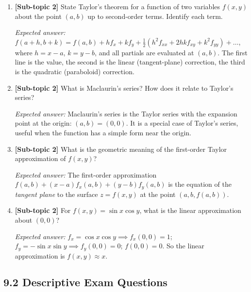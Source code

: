 \documentclass[12pt,a4paper]{article}
\begin{document}
\begin{enumerate}[leftmargin=*, label=\textbf{Q\arabic*.}]
  \textit{Expected answer:} \( J_1 \cdot J_2 = 1 \), provided the transformation is invertible. This is analogous to the chain rule for ordinary derivatives: \( (dy/dx)\cdot(dx/dy) = 1 \).

  \item \textbf{[Sub-topic 2]} State Taylor's theorem for a function of two variables \( f(x,y) \) about the point \( (a,b) \) up to second-order terms. Identify each term.

  \textit{Expected answer:} \( f(a+h,b+k) = f(a,b) + hf_x + kf_y + \tfrac{1}{2}(h^2f_{xx}+2hkf_{xy}+k^2f_{yy}) + \ldots \), where \( h=x-a \), \( k=y-b \), and all partials are evaluated at \( (a,b) \). The first line is the value, the second is the linear (tangent-plane) correction, the third is the quadratic (paraboloid) correction.

  \item \textbf{[Sub-topic 2]} What is Maclaurin's series? How does it relate to Taylor's series?

  \textit{Expected answer:} Maclaurin's series is the Taylor series with the expansion point at the origin: \( (a,b) = (0,0) \). It is a special case of Taylor's series, useful when the function has a simple form near the origin.

  \item \textbf{[Sub-topic 2]} What is the geometric meaning of the first-order Taylor approximation of \( f(x,y) \)?

  \textit{Expected answer:} The first-order approximation \( f(a,b) + (x-a)f_x(a,b) + (y-b)f_y(a,b) \) is the equation of the \emph{tangent plane} to the surface \( z = f(x,y) \) at the point \( (a,b,f(a,b)) \).

  \item \textbf{[Sub-topic 2]} For \( f(x,y) = \sin x \cos y \), what is the linear approximation about \( (0,0) \)?

  \textit{Expected answer:} \( f_x = \cos x\cos y \implies f_x(0,0) = 1 \); \( f_y = -\sin x\sin y \implies f_y(0,0) = 0 \); \( f(0,0) = 0 \). So the linear approximation is \( f(x,y) \approx x \).

\end{enumerate}

\subsection*{9.2 Descriptive Exam Questions}
\end{document}

